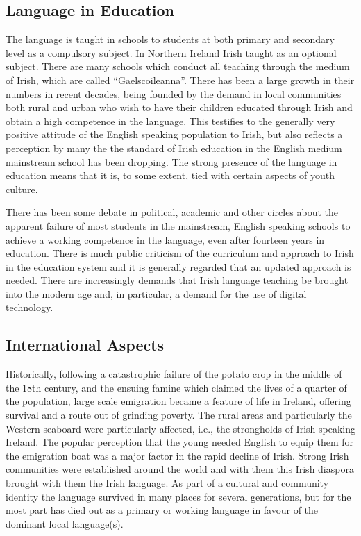 \begin{multicols}{2}
\subsection{Language in Education}

The language is taught in schools to students at both primary and secondary level as a compulsory subject. In Northern Ireland Irish taught as an optional subject. There are many schools  which conduct all teaching through the medium of Irish, which are called  ``Gaelscoileanna''. There has been a large growth in their numbers in recent decades, being founded by the demand in local communities both rural and urban who wish to have their children educated through Irish and obtain a high competence in the language. This testifies to the generally very positive attitude of the English speaking population to Irish, but also reflects a perception by many the the standard of Irish education in the English medium mainstream school has been dropping. The strong presence of the language in education means that it is, to some extent, tied with certain aspects of youth culture. 

There has been some debate in political, academic and other circles about the apparent failure of most students in the mainstream, English speaking schools to achieve a working competence in the language, even after fourteen years in education. There is much public criticism of the curriculum and approach to Irish in the education system and it is generally regarded that an updated approach is needed. There are increasingly demands that Irish language teaching be brought into the modern age and, in particular, a demand for the use of digital technology.


\subsection{International Aspects}

Historically, following a catastrophic failure of the potato crop in the middle of the 18th century, and the ensuing famine which claimed the lives of a quarter of the population, large scale emigration became a feature of life in Ireland, offering survival and a route out of grinding poverty. The rural areas and particularly the Western seaboard were particularly affected, i.e., the strongholds of Irish speaking Ireland.  The popular perception that the young needed English to equip them for the emigration boat was a major factor in the rapid decline of Irish. Strong Irish communities were established around the world and with them this Irish diaspora brought with them the Irish language. As part of a cultural and community identity the language survived in many places for several generations, but for the most part has died out as a primary or working language in favour of the dominant local language(s). 


\end{multicols}
